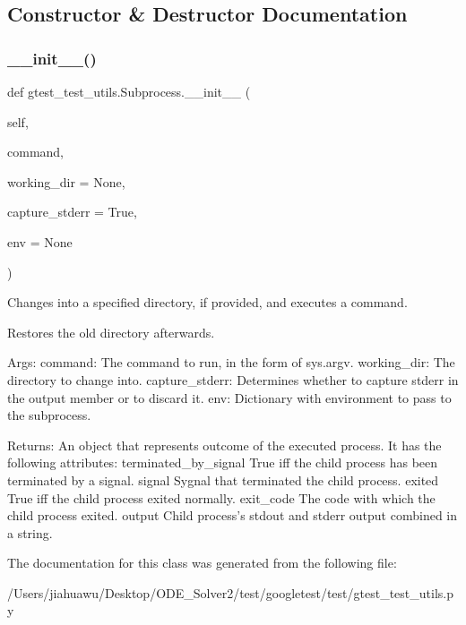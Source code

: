 \subsection{Constructor \& Destructor Documentation}
\mbox{\label{classgtest__test__utils_1_1_subprocess_a452a9e7d9988cc96e71b6fa09bbaddca}} 
\subsubsection{\texorpdfstring{\+\_\+\+\_\+init\+\_\+\+\_\+()}{\_\_init\_\_()}}
{\footnotesize\ttfamily def gtest\+\_\+test\+\_\+utils.\+Subprocess.\+\_\+\+\_\+init\+\_\+\+\_\+ (\begin{DoxyParamCaption}\item[{}]{self,  }\item[{}]{command,  }\item[{}]{working\+\_\+dir = {\ttfamily None},  }\item[{}]{capture\+\_\+stderr = {\ttfamily True},  }\item[{}]{env = {\ttfamily None} }\end{DoxyParamCaption})}

\begin{DoxyVerb}Changes into a specified directory, if provided, and executes a command.

Restores the old directory afterwards.

Args:
  command:        The command to run, in the form of sys.argv.
  working_dir:    The directory to change into.
  capture_stderr: Determines whether to capture stderr in the output member
              or to discard it.
  env:            Dictionary with environment to pass to the subprocess.

Returns:
  An object that represents outcome of the executed process. It has the
  following attributes:
terminated_by_signal   True iff the child process has been terminated
                       by a signal.
signal                 Sygnal that terminated the child process.
exited                 True iff the child process exited normally.
exit_code              The code with which the child process exited.
output                 Child process's stdout and stderr output
                       combined in a string.
\end{DoxyVerb}
 

The documentation for this class was generated from the following file\+:\begin{DoxyCompactItemize}
\item 
/\+Users/jiahuawu/\+Desktop/\+O\+D\+E\+\_\+\+Solver2/test/googletest/test/gtest\+\_\+test\+\_\+utils.\+py\end{DoxyCompactItemize}
